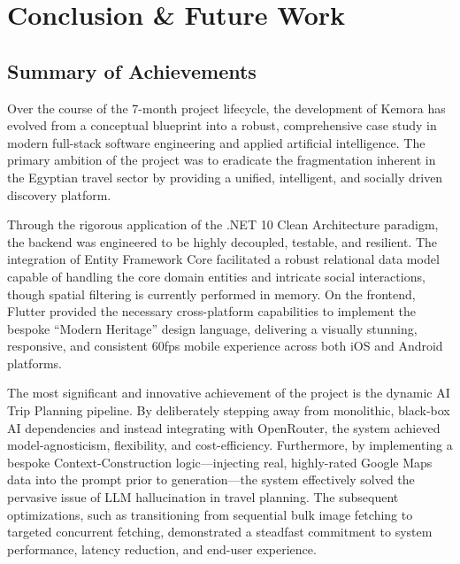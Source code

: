 \chapter{Conclusion \& Future Work}

\section{Summary of Achievements}
Over the course of the 7-month project lifecycle, the development of Kemora has evolved from a conceptual blueprint into a robust, comprehensive case study in modern full-stack software engineering and applied artificial intelligence. The primary ambition of the project was to eradicate the fragmentation inherent in the Egyptian travel sector by providing a unified, intelligent, and socially driven discovery platform.

Through the rigorous application of the .NET 10 Clean Architecture paradigm, the backend was engineered to be highly decoupled, testable, and resilient. The integration of Entity Framework Core facilitated a robust relational data model capable of handling the core domain entities and intricate social interactions, though spatial filtering is currently performed in memory. On the frontend, Flutter provided the necessary cross-platform capabilities to implement the bespoke ``Modern Heritage'' design language, delivering a visually stunning, responsive, and consistent 60fps mobile experience across both iOS and Android platforms.

The most significant and innovative achievement of the project is the dynamic AI Trip Planning pipeline. By deliberately stepping away from monolithic, black-box AI dependencies and instead integrating with OpenRouter, the system achieved model-agnosticism, flexibility, and cost-efficiency. Furthermore, by implementing a bespoke Context-Construction logic---injecting real, highly-rated Google Maps data into the prompt prior to generation---the system effectively solved the pervasive issue of LLM hallucination in travel planning. The subsequent optimizations, such as transitioning from sequential bulk image fetching to targeted concurrent fetching, demonstrated a steadfast commitment to system performance, latency reduction, and end-user experience.

